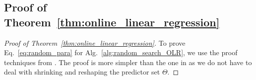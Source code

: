 \subsection{Proof of Theorem~\ref{thm:online_linear_regression}}
\label{sec:proofs_bandit}
\begin{proof}[Proof of Theorem~\ref{thm:online_linear_regression}]

To prove Eq.~\ref{eq:random_para} for Alg.~\ref{alg:random_search_OLR}, we use the proof techniques from \cite{flaxman2005online}. The proof is more simpler than the one in \cite{flaxman2005online} as we do not have to deal with shrinking and reshaping the predictor set ${\Theta}$.


\end{proof}
